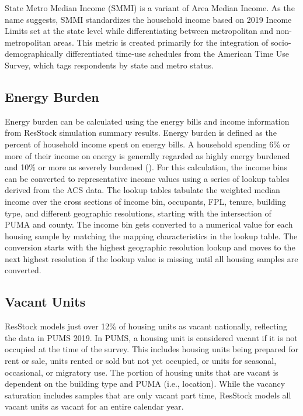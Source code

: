State Metro Median Income (SMMI) is a variant of Area Median Income. As the name suggests, SMMI standardizes the household income based on 2019 Income Limits set at the state level while differentiating between metropolitan and non-metropolitan areas. This metric is created primarily for the integration of socio-demographically differentiated time-use schedules from the American Time Use Survey, which tags respondents by state and metro status.

\subsection{Energy Burden}\label{resstock_input_energy_burden}
Energy burden can be calculated using the energy bills and income information from ResStock simulation summary results. Energy burden is defined as the percent of household income spent on energy bills. A household spending 6\% or more of their income on energy is generally regarded as highly energy burdened and 10\% or more as severely burdened (\cite{drehobl2020_energy_burden}). For this calculation, the income bins can be converted to representative income values using a series of lookup tables derived from the ACS data. The lookup tables tabulate the weighted median income over the cross sections of income bin, occupants, FPL, tenure, building type, and different geographic resolutions, starting with the intersection of PUMA and county. The income bin gets converted to a numerical value for each housing sample by matching the mapping characteristics in the lookup table. The conversion starts with the highest geographic resolution lookup and moves to the next highest resolution if the lookup value is missing until all housing samples are converted.

\subsection{Vacant Units}\label{vacant_units}
ResStock models just over 12\% of housing units as vacant nationally, reflecting the data in PUMS 2019. In PUMS, a housing unit is considered vacant if it is not occupied at the time of the survey. This includes housing units being prepared for rent or sale, units rented or sold but not yet occupied, or units for seasonal, occasional, or migratory use. The portion of housing units that are vacant is dependent on the building type and PUMA (i.e., location). While the vacancy saturation includes samples that are only vacant part time, ResStock models all vacant units as vacant for an entire calendar year.

